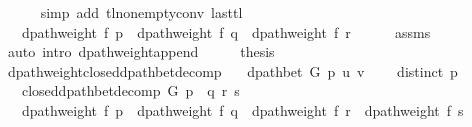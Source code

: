 \begin{isabellebody}
\ \ \ \ \isamarkupfalse%
\ {\isacharparenleft}{\kern0pt}simp\ add{\isacharcolon}{\kern0pt}\ tl{\isacharunderscore}{\kern0pt}non{\isacharunderscore}{\kern0pt}empty{\isacharunderscore}{\kern0pt}conv\ last{\isacharunderscore}{\kern0pt}tl{\isacharparenright}{\kern0pt}\isanewline
\ \ \isamarkupfalse%
\ \isamarkupfalse%
\ {\isachardoublequoteopen}{\isachardot}{\kern0pt}{\isachardot}{\kern0pt}{\isachardot}{\kern0pt}\ {\isacharequal}{\kern0pt}\ dpath{\isacharunderscore}{\kern0pt}weight\ f\ p\ {\isacharplus}{\kern0pt}\ dpath{\isacharunderscore}{\kern0pt}weight\ f\ q\ {\isacharplus}{\kern0pt}\ dpath{\isacharunderscore}{\kern0pt}weight\ f\ r{\isachardoublequoteclose}\isanewline
\ \ \ \ \isamarkupfalse%
\ assms{\isacharparenleft}{\kern0pt}{}{\isacharcomma}{\kern0pt}\ {}{\isacharcomma}{\kern0pt}\ {}{\isacharparenright}{\kern0pt}\isanewline
\ \ \ \ \isamarkupfalse%
\ {\isacharparenleft}{\kern0pt}auto\ intro{\isacharcolon}{\kern0pt}\ dpath{\isacharunderscore}{\kern0pt}weight{\isacharunderscore}{\kern0pt}append{\isacharunderscore}{\kern0pt}{}{\isacharparenright}{\kern0pt}\isanewline
\ \ \isamarkupfalse%
\ \isamarkupfalse%
\ {\isacharquery}{\kern0pt}thesis\isanewline
\ \ \ \ \isacommand{{\isachardot}{\kern0pt}}\isamarkupfalse%
\isanewline
{}\isamarkupfalse%
%
\endisatagproof
{\isafoldproof}%
%
\isadelimproof
\isanewline
%
\endisadelimproof
%
\isadeliminvisible
\isanewline
%
\endisadeliminvisible
%
\isataginvisible
{}\isamarkupfalse%
\ dpath{\isacharunderscore}{\kern0pt}weight{\isacharunderscore}{\kern0pt}closed{\isacharunderscore}{\kern0pt}dpath{\isacharunderscore}{\kern0pt}bet{\isacharunderscore}{\kern0pt}decomp{\isacharcolon}{\kern0pt}\isanewline
\ \ \ {\isachardoublequoteopen}dpath{\isacharunderscore}{\kern0pt}bet\ G\ p\ u\ v{\isachardoublequoteclose}\isanewline
\ \ \ {\isachardoublequoteopen}{\isasymnot}\ distinct\ p{\isachardoublequoteclose}\isanewline
\ \ \ {\isachardoublequoteopen}closed{\isacharunderscore}{\kern0pt}dpath{\isacharunderscore}{\kern0pt}bet{\isacharunderscore}{\kern0pt}decomp\ G\ p\ {\isacharequal}{\kern0pt}\ {\isacharparenleft}{\kern0pt}q{\isacharcomma}{\kern0pt}\ r{\isacharcomma}{\kern0pt}\ s{\isacharparenright}{\kern0pt}{\isachardoublequoteclose}\isanewline
\ \ \ {\isachardoublequoteopen}dpath{\isacharunderscore}{\kern0pt}weight\ f\ p\ {\isacharequal}{\kern0pt}\ dpath{\isacharunderscore}{\kern0pt}weight\ f\ q\ {\isacharplus}{\kern0pt}\ dpath{\isacharunderscore}{\kern0pt}weight\ f\ r\ {\isacharplus}{\kern0pt}\ dpath{\isacharunderscore}{\kern0pt}weight\ f\ s{\isachardoublequoteclose}%

\end{isabellebody}

